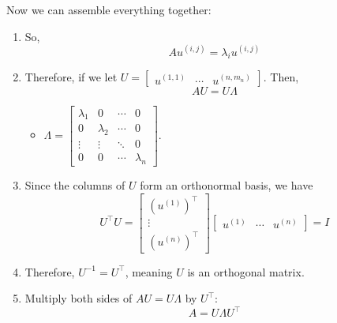 \begin{derivation}
    Now we can assemble everything together: 
    \begin{enumerate}
        \item So, 
        \[
        A u^{(i,j)} = \lambda_i u^{(i,j)}
        \]
        \item Therefore, if we let $U = \begin{bmatrix} u^{(1,1)} & \cdots & u^{(n,m_n)} \end{bmatrix}$. Then,
        \[
        A U = U \Lambda
        \]
        \begin{itemize}
            \item $\Lambda = \begin{bmatrix} \lambda_1 & 0 & \cdots & 0 \\ 0 & \lambda_2 & \cdots & 0 \\ \vdots & \vdots & \ddots & 0 \\ 0 & 0 & \cdots & \lambda_n \end{bmatrix}$.
        \end{itemize}
        \item Since the columns of $U$ form an orthonormal basis, we have
        \[
        U^\top U = \begin{bmatrix}
        (u^{(1)})^\top \\
        \vdots \\
        (u^{(n)})^\top
        \end{bmatrix}
        \begin{bmatrix}
        u^{(1)} & \cdots & u^{(n)}
        \end{bmatrix}
        = I
        \]
        \item Therefore, $U^{-1} = U^\top$, meaning $U$ is an orthogonal matrix.
        \item Multiply both sides of $A U = U \Lambda$ by $U^\top$:
        \[
        A = U \Lambda U^\top
        \]
    \end{enumerate}
\end{derivation}

